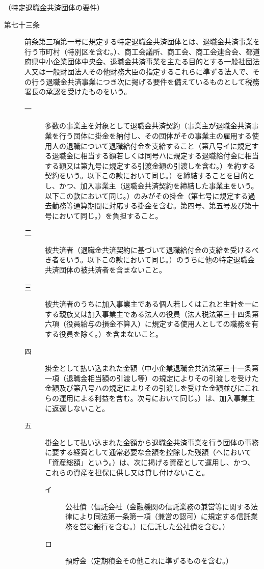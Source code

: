 \documentclass[twocolumn,a4j,10pt]{ltjtarticle}
\begin{document}
\noindent\hspace{10pt}（特定退職金共済団体の要件）
\begin{description}
\item[第七十三条]前条第三項第一号に規定する特定退職金共済団体とは、退職金共済事業を行う市町村（特別区を含む。）、商工会議所、商工会、商工会連合会、都道府県中小企業団体中央会、退職金共済事業を主たる目的とする一般社団法人又は一般財団法人その他財務大臣の指定するこれらに準ずる法人で、その行う退職金共済事業につき次に掲げる要件を備えているものとして税務署長の承認を受けたものをいう。
\begin{description}
\item[一]多数の事業主を対象として退職金共済契約（事業主が退職金共済事業を行う団体に掛金を納付し、その団体がその事業主の雇用する使用人の退職について退職給付金を支給すること（第八号イに規定する退職金に相当する額若しくは同号ハに規定する退職給付金に相当する額又は第九号に規定する引渡金額の引渡しを含む。）を約する契約をいう。以下この款において同じ。）を締結することを目的とし、かつ、加入事業主（退職金共済契約を締結した事業主をいう。以下この款において同じ。）のみがその掛金（第七号に規定する過去勤務等通算期間に対応する掛金を含む。第四号、第五号及び第十号において同じ。）を負担すること。
\item[二]被共済者（退職金共済契約に基づいて退職給付金の支給を受けるべき者をいう。以下この款において同じ。）のうちに他の特定退職金共済団体の被共済者を含まないこと。
\item[三]被共済者のうちに加入事業主である個人若しくはこれと生計を一にする親族又は加入事業主である法人の役員（法人税法第三十四条第六項（役員給与の損金不算入）に規定する使用人としての職務を有する役員を除く。）を含まないこと。
\item[四]掛金として払い込まれた金額（中小企業退職金共済法第三十一条第一項（退職金相当額の引渡し等）の規定によりその引渡しを受けた金額及び第八号ハの規定によりその引渡しを受けた金額並びにこれらの運用による利益を含む。次号において同じ。）は、加入事業主に返還しないこと。
\item[五]掛金として払い込まれた金額から退職金共済事業を行う団体の事務に要する経費として通常必要な金額を控除した残額（ヘにおいて「資産総額」という。）は、次に掲げる資産として運用し、かつ、これらの資産を担保に供し又は貸し付けないこと。
\begin{description}
\item[イ]公社債（信託会社（金融機関の信託業務の兼営等に関する法律により同法第一条第一項（兼営の認可）に規定する信託業務を営む銀行を含む。）に信託した公社債を含む。）
\item[ロ]預貯金（定期積金その他これに準ずるものを含む。）

\end{description}
\end{description}
\end{description}
\end{document}
